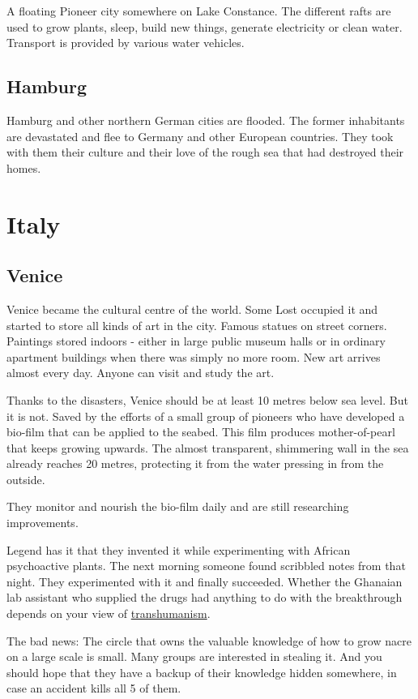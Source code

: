 A floating Pioneer city somewhere on Lake Constance. The different rafts are used to grow plants, sleep, build new things, generate electricity or clean water. Transport is provided by various water vehicles.

\subsection{Hamburg}
\label{subsec:Hamburg}

Hamburg and other northern German cities are flooded. The former inhabitants are devastated and flee to Germany and other European countries. They took with them their culture and their love of the rough sea that had destroyed their homes.

\section{Italy}

\subsection{Venice}

Venice became the cultural centre of the world. Some Lost occupied it and started to store all kinds of art in the city. Famous statues on street corners. Paintings stored indoors - either in large public museum halls or in ordinary apartment buildings when there was simply no more room. New art arrives almost every day.
Anyone can visit and study the art.

Thanks to the disasters, Venice should be at least 10 metres below sea level. But it is not. Saved by the efforts of a small group of pioneers who have developed a bio-film that can be applied to the seabed. This film produces mother-of-pearl that keeps growing upwards. The almost transparent, shimmering wall in the sea already reaches 20 metres, protecting it from the water pressing in from the outside.

They monitor and nourish the bio-film daily and are still researching improvements.

Legend has it that they invented it while experimenting with African psychoactive plants. The next morning someone found scribbled notes from that night. They experimented with it and finally succeeded. Whether the Ghanaian lab assistant who supplied the drugs had anything to do with the breakthrough depends on your view of \hyperref[sec:transhumanism]{transhumanism}.

The bad news: The circle that owns the valuable knowledge of how to grow nacre on a large scale is small. Many groups are interested in stealing it. And you should hope that they have a backup of their knowledge hidden somewhere, in case an accident kills all 5 of them.






